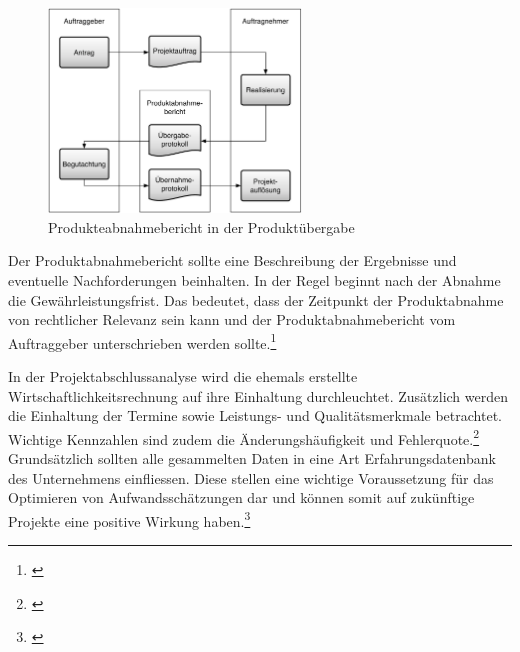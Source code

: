 \begin{figure}[htbp]
\begin{center}
\includegraphics[width=0.6\textwidth,angle=0]{./bilder/theorie/07_produkteuebergabe.pdf}
\caption[Produkteabnahmebericht in der Produktübergabe]{Produkteabnahmebericht in der Produktübergabe\footnotemark}
\label{pic:07_produkteuebergabe}
\end{center}
\end{figure}

Der Produktabnahmebericht sollte eine Beschreibung der Ergebnisse und eventuelle
Nachforderungen beinhalten. In der Regel beginnt nach der Abnahme die
Gewährleistungsfrist. Das bedeutet, dass der Zeitpunkt der Produktabnahme von
rechtlicher Relevanz sein kann und der Produktabnahmebericht vom Auftraggeber
unterschrieben werden sollte.\footnote{\citealp*[Vgl.][S. 86]{cronenbroeck2004handbuch}}

In der Projektabschlussanalyse wird die ehemals erstellte Wirtschaftlichkeitsrechnung
auf ihre Einhaltung durchleuchtet. Zusätzlich werden die Einhaltung der Termine sowie
Leistungs- und Qualitätsmerkmale betrachtet. Wichtige Kennzahlen sind zudem
die Änderungshäufigkeit und Fehlerquote.\footnote{\citealp*[Vgl.][S. 265]{schelle2007projekte}}
Grundsätzlich sollten alle gesammelten Daten in eine Art Erfahrungsdatenbank 
des Unternehmens einfliessen. Diese stellen eine wichtige Voraussetzung für das 
Optimieren von Aufwandsschätzungen dar und können somit auf zukünftige Projekte 
eine positive Wirkung haben.\footnote{\citealp*[Vgl.][S. 275]{burghardt2007einfuehrung}}

\clearpage

